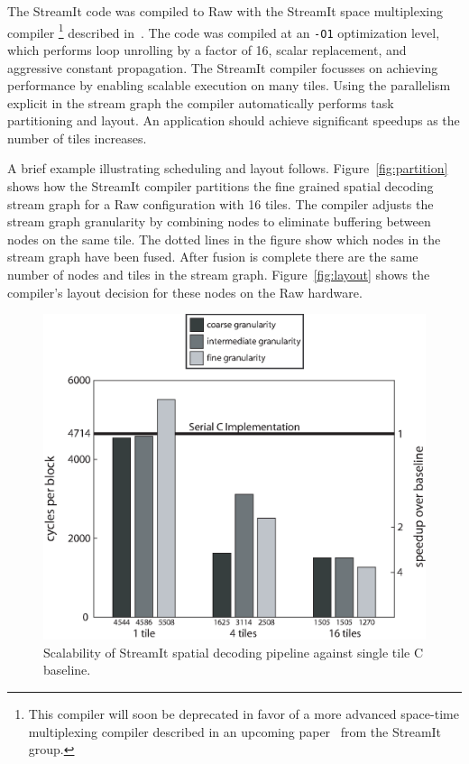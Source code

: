 The StreamIt code was compiled to Raw with the StreamIt 
space multiplexing compiler
\footnote{This compiler will soon be
deprecated in favor of a more advanced space-time multiplexing
compiler described in an upcoming paper~\cite{gordon06asplos} 
from the StreamIt group.}
described in~\cite{gordon02asplos}.
The code was compiled at an \texttt{-O1} optimization level, 
which performs loop unrolling by a factor
of 16, scalar replacement, and aggressive constant propagation. 
The StreamIt compiler focusses on achieving
performance by enabling scalable execution on
many tiles. Using the parallelism explicit in the stream graph the compiler
automatically performs task partitioning and layout.
An application should achieve significant speedups as the number of tiles increases.

A brief example illustrating
scheduling and layout follows.
Figure~\ref{fig:partition} shows how the StreamIt
compiler partitions the fine grained 
spatial decoding stream graph for a Raw configuration with 16 tiles.
The compiler adjusts the stream graph granularity by combining
nodes to eliminate buffering between nodes on the same tile. 
The dotted lines in the figure show which nodes in the stream graph have been fused.
After fusion is complete there are the same number of nodes and tiles 
in the stream graph. Figure~\ref{fig:layout}
shows the compiler's layout decision for these nodes on the Raw hardware.

\begin{figure}[t]
  \begin{center}
    \includegraphics[scale=0.7, angle=0]{./performance_graph.eps}
    \caption{Scalability of StreamIt spatial decoding pipeline against single tile C baseline.}
    \label{fig:performance_results}
  \end{center}
\end{figure}

